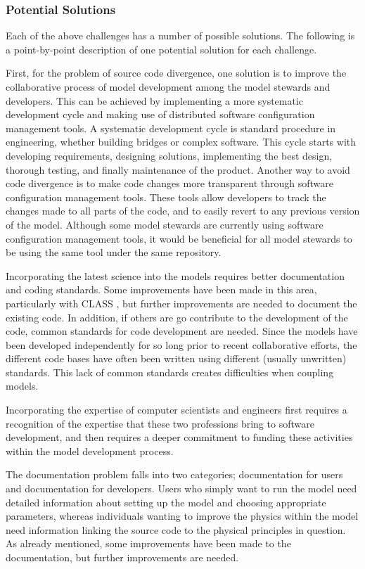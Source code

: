 \documentclass[hess]{copernicus}
\begin{document}
\subsubsection{Potential Solutions}
Each of the above challenges has a number of possible solutions. The following is a point-by-point description of one potential solution for each challenge.

First, for the problem of source code divergence, one solution is to improve the collaborative process of model development among the model stewards and developers. This can be achieved by implementing a more systematic development cycle and making use of distributed software configuration management tools. A systematic development cycle is standard procedure in engineering, whether building bridges or complex software. This cycle starts with developing requirements, designing solutions, implementing the best design, thorough testing, and finally maintenance of the product. Another way to avoid code divergence is to make code changes more transparent through software configuration management tools. These tools allow developers to track the changes made to all parts of the code, and to easily revert to any previous version of the model. Although some model stewards are currently using software configuration management tools, it would be beneficial for all model stewards to be using the same tool under the same repository.

Incorporating the latest science into the models requires better documentation and coding standards. Some improvements have been made in this area, particularly with CLASS \citep{verseghy:2009}, but further improvements are needed to document the existing code. In addition, if others are go contribute to the development of the code, common standards for code development are needed. Since the models have been developed independently for so long prior to recent collaborative efforts, the different code bases have often been written using different (usually unwritten) standards. This lack of common standards creates difficulties when coupling models.

Incorporating the expertise of computer scientists and engineers first requires a recognition of the expertise that these two professions bring to software development, and then requires a deeper commitment to funding these activities within the model development process.

The documentation problem falls into two categories; documentation for users and documentation for developers. Users who simply want to run the model need detailed information about setting up the model and choosing appropriate parameters, whereas individuals wanting to improve the physics within the model need information linking the source code to the physical principles in question. As already mentioned, some improvements have been made to the documentation, but further improvements are needed.
\end{document}
